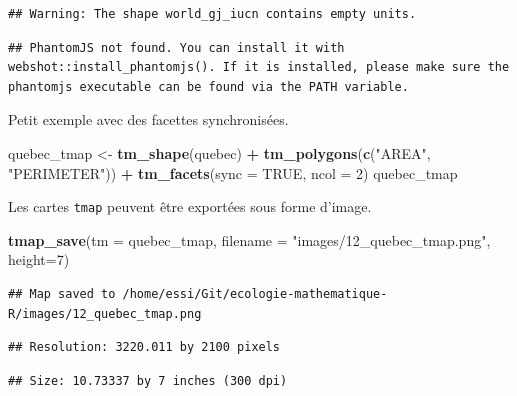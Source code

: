 \documentclass[]{book}
\newenvironment{Shaded}{\begin{snugshade}}{\end{snugshade}}
\newcommand{\DataTypeTok}[1]{\textcolor[rgb]{0.13,0.29,0.53}{#1}}
\newcommand{\DecValTok}[1]{\textcolor[rgb]{0.00,0.00,0.81}{#1}}
\newcommand{\KeywordTok}[1]{\textcolor[rgb]{0.13,0.29,0.53}{\textbf{#1}}}
\newcommand{\NormalTok}[1]{#1}
\newcommand{\OperatorTok}[1]{\textcolor[rgb]{0.81,0.36,0.00}{\textbf{#1}}}
\newcommand{\OtherTok}[1]{\textcolor[rgb]{0.56,0.35,0.01}{#1}}
\newcommand{\StringTok}[1]{\textcolor[rgb]{0.31,0.60,0.02}{#1}}
\begin{document}
\begin{verbatim}
## Warning: The shape world_gj_iucn contains empty units.
\end{verbatim}

\begin{verbatim}
## PhantomJS not found. You can install it with webshot::install_phantomjs(). If it is installed, please make sure the phantomjs executable can be found via the PATH variable.
\end{verbatim}

\hypertarget{htmlwidget-4ed7728698f380d1b524}{}

Petit exemple avec des facettes synchronisées.

\begin{Shaded}
\begin{Highlighting}[]
\NormalTok{quebec_tmap <-}\StringTok{ }\KeywordTok{tm_shape}\NormalTok{(quebec) }\OperatorTok{+}
\StringTok{  }\KeywordTok{tm_polygons}\NormalTok{(}\KeywordTok{c}\NormalTok{(}\StringTok{"AREA"}\NormalTok{, }\StringTok{"PERIMETER"}\NormalTok{)) }\OperatorTok{+}
\StringTok{  }\KeywordTok{tm_facets}\NormalTok{(}\DataTypeTok{sync =} \OtherTok{TRUE}\NormalTok{, }\DataTypeTok{ncol =} \DecValTok{2}\NormalTok{)}
\NormalTok{quebec_tmap}
\end{Highlighting}
\end{Shaded}

\hypertarget{htmlwidget-6262}{}

\hypertarget{htmlwidget-7572}{}

Les cartes \texttt{tmap} peuvent être exportées sous forme d'image.

\begin{Shaded}
\begin{Highlighting}[]
\KeywordTok{tmap_save}\NormalTok{(}\DataTypeTok{tm =}\NormalTok{ quebec_tmap, }\DataTypeTok{filename =} \StringTok{"images/12_quebec_tmap.png"}\NormalTok{, }\DataTypeTok{height=}\DecValTok{7}\NormalTok{)}
\end{Highlighting}
\end{Shaded}

\begin{verbatim}
## Map saved to /home/essi/Git/ecologie-mathematique-R/images/12_quebec_tmap.png
\end{verbatim}

\begin{verbatim}
## Resolution: 3220.011 by 2100 pixels
\end{verbatim}

\begin{verbatim}
## Size: 10.73337 by 7 inches (300 dpi)
\end{verbatim}
\end{document}
